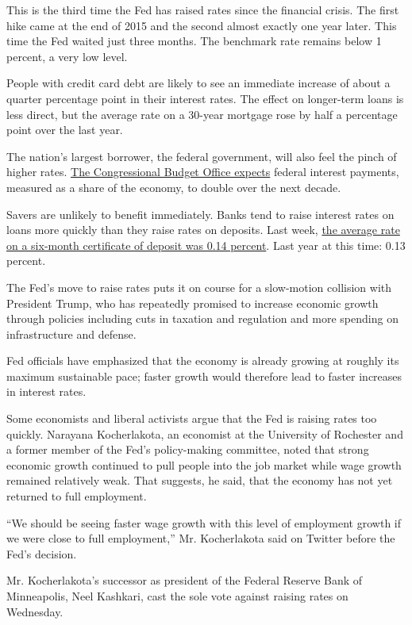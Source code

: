 This is the third time the Fed has raised rates since the financial
crisis. The first hike came at the end of 2015 and the second almost
exactly one year later. This time the Fed waited just three months. The
benchmark rate remains below 1 percent, a very low level.

People with credit card debt are likely to see an immediate increase of
about a quarter percentage point in their interest rates. The effect on
longer-term loans is less direct, but the average rate on a 30-year
mortgage rose by half a percentage point over the last year.

The nation's largest borrower, the federal government, will also feel
the pinch of higher rates.
\href{https://www.cbo.gov/publication/51841}{The Congressional Budget
Office expects} federal interest payments, measured as a share of the
economy, to double over the next decade.

Savers are unlikely to benefit immediately. Banks tend to raise interest
rates on loans more quickly than they raise rates on deposits. Last
week,
\href{https://www.fdic.gov/regulations/resources/rates/index.html}{the
average rate on a six-month certificate of deposit was 0.14 percent}.
Last year at this time: 0.13 percent.

The Fed's move to raise rates puts it on course for a slow-motion
collision with President Trump, who has repeatedly promised to increase
economic growth through policies including cuts in taxation and
regulation and more spending on infrastructure and defense.

Fed officials have emphasized that the economy is already growing at
roughly its maximum sustainable pace; faster growth would therefore lead
to faster increases in interest rates.

Some economists and liberal activists argue that the Fed is raising
rates too quickly. Narayana Kocherlakota, an economist at the University
of Rochester and a former member of the Fed's policy-making committee,
noted that strong economic growth continued to pull people into the job
market while wage growth remained relatively weak. That suggests, he
said, that the economy has not yet returned to full employment.

``We should be seeing faster wage growth with this level of employment
growth if we were close to full employment,'' Mr. Kocherlakota said on
Twitter before the Fed's decision.

Mr. Kocherlakota's successor as president of the Federal Reserve Bank of
Minneapolis, Neel Kashkari, cast the sole vote against raising rates on
Wednesday.

